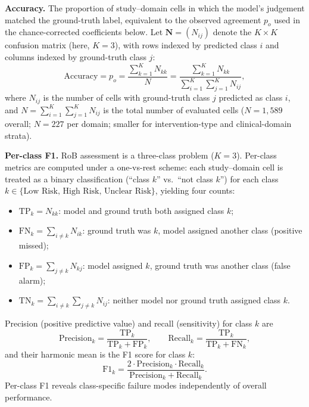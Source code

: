\documentclass[../main.tex]{subfiles}
\begin{document}
\textbf{Accuracy.}
The proportion of study--domain cells in which the model's judgement matched
the ground-truth label, equivalent to the observed agreement $p_o$ used in
the chance-corrected coefficients below.
Let $\mathbf{N} = (N_{ij})$ denote the $K \times K$ confusion matrix (here, $K=3$),
with rows indexed by predicted class $i$ and columns indexed by ground-truth
class $j$:
\begin{equation}
  \text{Accuracy} = p_o = \frac{\sum_{k=1}^{K} N_{kk}}{N}
  = \frac{\sum_{k=1}^{K} N_{kk}}{\sum_{i=1}^{K}\sum_{j=1}^{K} N_{ij}},
  \label{eq:accuracy}
\end{equation}
where $N_{ij}$ is the number of cells with ground-truth class $j$ predicted as
class $i$, and
\(
N = \sum_{i=1}^{K}\sum_{j=1}^{K} N_{ij}
\)
is the total number of evaluated cells ($N = 1{,}589$ overall; $N = 227$ per
domain; smaller for intervention-type and clinical-domain strata).

\textbf{Per-class F1.}
RoB assessment is a three-class problem ($K = 3$).
Per-class metrics are computed under a one-vs-rest scheme: each study--domain cell is
treated as a binary classification (``class $k$'' vs.\ ``not class $k$'') for each class
$k \in \{\text{Low Risk, High Risk, Unclear Risk}\}$,
yielding four counts:
\begin{itemize}
  \item $\mathrm{TP}_k = N_{kk}$: model and ground truth both assigned class $k$;
  \item $\mathrm{FN}_k = \sum\limits_{i \neq k} N_{ik}$: ground truth was $k$, model assigned another class
        (positive missed);
  \item $\mathrm{FP}_k = \sum\limits_{j \neq k} N_{kj}$: model assigned $k$, ground truth was another class
        (false alarm);
  \item $\mathrm{TN}_k = \sum\limits_{i \neq k}\sum\limits_{j \neq k} N_{ij}$: neither model nor ground truth assigned class $k$.
\end{itemize}
Precision (positive predictive value) and recall (sensitivity) for class $k$ are
\begin{equation}
  \mathrm{Precision}_k = \frac{\mathrm{TP}_k}{\mathrm{TP}_k + \mathrm{FP}_k},
  \qquad
  \mathrm{Recall}_k    = \frac{\mathrm{TP}_k}{\mathrm{TP}_k + \mathrm{FN}_k},
  \label{eq:prec-rec}
\end{equation}
and their harmonic mean is the F1 score for class $k$:
\begin{equation}
  \mathrm{F1}_k = \frac{2 \cdot \mathrm{Precision}_k \cdot \mathrm{Recall}_k}
                       {\mathrm{Precision}_k + \mathrm{Recall}_k}.
  \label{eq:f1}
\end{equation}
Per-class F1 reveals class-specific failure modes independently of overall performance.
\end{document}

